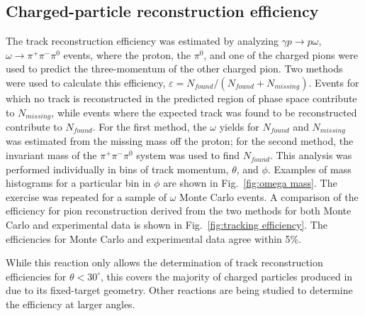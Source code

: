 \subsection{Charged-particle reconstruction efficiency  \label{sec:trackeff}}
The track reconstruction efficiency was estimated by analyzing $\gamma p \rightarrow p \omega$, $\omega\rightarrow\pi^+\pi^-\pi^0$ events, where the proton, the $\pi^0$, and one of the charged pions were used to predict the three-momentum of the other charged pion. Two methods were used to calculate this efficiency, $\varepsilon=N_{found}/(N_{found}+N_{missing})$.  Events for which no track is reconstructed in the predicted region of 
phase space contribute to $N_{missing}$, while events where the expected track was found to be reconstructed contribute to $N_{found}$.  For the first method, the $\omega$ yields for $N_{found}$ and $N_{missing}$ was estimated from the missing mass off the 
proton; for the second method, the invariant mass of the $\pi^+\pi^-\pi^0$ system was used to find $N_{found}$.  This analysis was performed individually in bins of track momentum, $\theta$, and $\phi$.
Examples of mass histograms for a particular bin in $\phi$ are shown in Fig.~\ref{fig:omega mass}.  The exercise was repeated for a sample of $\omega$ Monte Carlo events.   A comparison of the efficiency for pion reconstruction derived from the 
two methods for both Monte Carlo and experimental data is shown in Fig.~\ref{fig:tracking efficiency}.  The efficiencies for Monte Carlo and experimental data 
agree within 5\%.

While this reaction only allows the determination of track reconstruction efficiencies for $\theta < 30^\circ$, this covers the majority of charged particles produced in \gx{} due to its fixed-target geometry.  Other reactions are being studied to determine the efficiency at larger angles.

